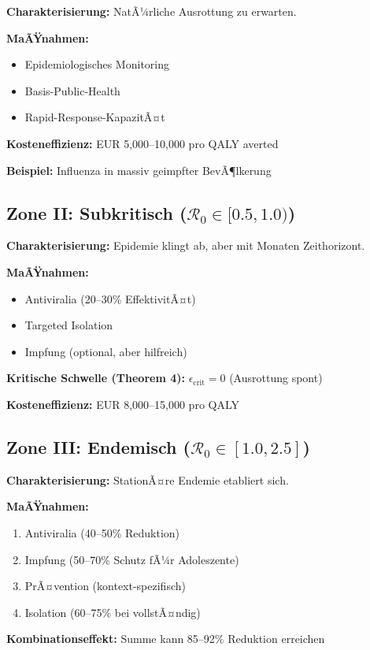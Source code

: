 ﻿\documentclass[a4paper,12pt,twoside]{article}
\theoremstyle{definition}
\begin{document}
\textbf{Charakterisierung:} NatÃ¼rliche Ausrottung zu erwarten.

\textbf{MaÃŸnahmen:}
\begin{itemize}
\item Epidemiologisches Monitoring
\item Basis-Public-Health
\item Rapid-Response-KapazitÃ¤t
\end{itemize}

\textbf{Kosteneffizienz:} EUR 5,000--10,000 pro QALY averted

\textbf{Beispiel:} Influenza in massiv geimpfter BevÃ¶lkerung

\subsection{Zone II: Subkritisch ($\mathcal{R}_0 \in [0.5, 1.0)$)}

\textbf{Charakterisierung:} Epidemie klingt ab, aber mit Monaten Zeithorizont.

\textbf{MaÃŸnahmen:}
\begin{itemize}
\item Antiviralia (20--30\% EffektivitÃ¤t)
\item Targeted Isolation
\item Impfung (optional, aber hilfreich)
\end{itemize}

\textbf{Kritische Schwelle (Theorem 4):} $\epsilon_{\text{crit}} = 0$ (Ausrottung spont)

\textbf{Kosteneffizienz:} EUR 8,000--15,000 pro QALY

\subsection{Zone III: Endemisch ($\mathcal{R}_0 \in [1.0, 2.5]$)}

\textbf{Charakterisierung:} StationÃ¤re Endemie etabliert sich.

\textbf{MaÃŸnahmen:}
\begin{enumerate}
\item Antiviralia (40--50\% Reduktion)
\item Impfung (50--70\% Schutz fÃ¼r Adoleszente)
\item PrÃ¤vention (kontext-spezifisch)
\item Isolation (60--75\% bei vollstÃ¤ndig)
\end{enumerate}

\textbf{Kombinationseffekt:} Summe kann 85--92\% Reduktion erreichen
\end{document}
